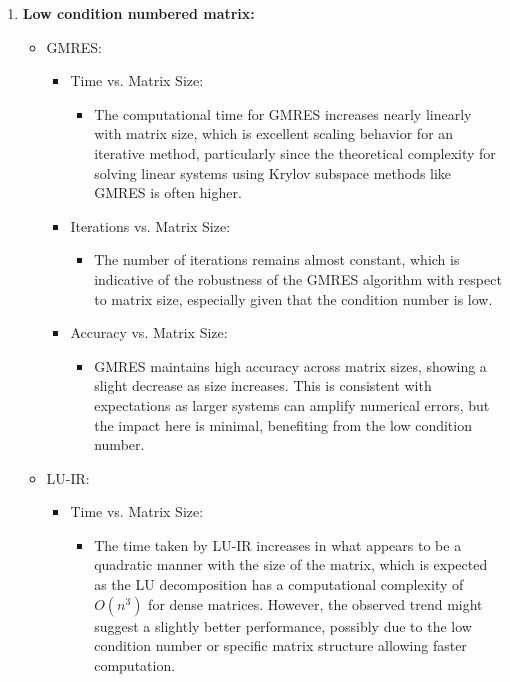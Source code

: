 \begin{enumerate}
\begin{itemize}
    \end{itemize}
    \item \textbf{Low condition numbered matrix:}
    \begin{itemize}
        \item GMRES:
        \begin{itemize}
            \item  Time vs. Matrix Size:
            \begin{itemize}
                \item The computational time for GMRES increases nearly linearly with matrix size, which is excellent scaling behavior for an iterative method, particularly since the theoretical complexity for solving linear systems using Krylov subspace methods like GMRES is often higher.
            \end{itemize}
            \item Iterations vs. Matrix Size:
            \begin{itemize}
                \item The number of iterations remains almost constant, which is indicative of the robustness of the GMRES algorithm with respect to matrix size, especially given that the condition number is low.
            \end{itemize}
            \item Accuracy vs. Matrix Size:
            \begin{itemize}
                \item GMRES maintains high accuracy across matrix sizes, showing a slight decrease as size increases. This is consistent with expectations as larger systems can amplify numerical errors, but the impact here is minimal, benefiting from the low condition number.
            \end{itemize}
        \end{itemize}
        \item LU-IR:
        \begin{itemize}
            \item Time vs. Matrix Size:
            \begin{itemize}
                \item The time taken by LU-IR increases in what appears to be a quadratic manner with the size of the matrix, which is expected as the LU decomposition has a computational complexity of $O(n^3)$ for dense matrices. However, the observed trend might suggest a slightly better performance, possibly due to the low condition number or specific matrix structure allowing faster computation.

\end{itemize}
\end{itemize}
\end{itemize}
\end{enumerate}

